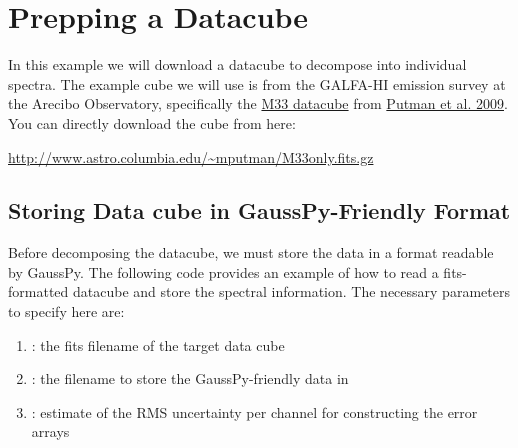 \documentclass[letterpaper,10pt,openany,oneside]{sphinxmanual}
\begin{document}
\chapter{Prepping a Datacube}
\label{dataprep:prepping-a-datacube}\label{dataprep:dataprep}\label{dataprep::doc}
In this example we will download a datacube to decompose into individual
spectra. The example cube we will use is from the GALFA-HI emission survey at
the Arecibo Observatory, specifically the \href{https://sites.google.com/site/galfahi/data}{M33 datacube} from \href{http://adsabs.harvard.edu/abs/2009ApJ...703.1486P}{Putman et al. 2009}. You can directly download
the cube from here:

\href{http://www.astro.columbia.edu/~mputman/M33only.fits.gz}{http://www.astro.columbia.edu/\textasciitilde{}mputman/M33only.fits.gz}


\section{Storing Data cube in GaussPy-Friendly Format}
\label{dataprep:storing-data-cube-in-gausspy-friendly-format}
Before decomposing the datacube, we must store the data in a format readable by
GaussPy. The following code provides an example of how to read a fits-formatted
datacube and store the spectral information. The necessary parameters to specify
here are:
\begin{enumerate}
\item {} 
: the fits filename of the target data cube

\item {} 
: the filename to store the GaussPy-friendly data in

\item {} 
: estimate of the RMS uncertainty per channel for constructing the
error arrays

\end{enumerate}
\end{document}
